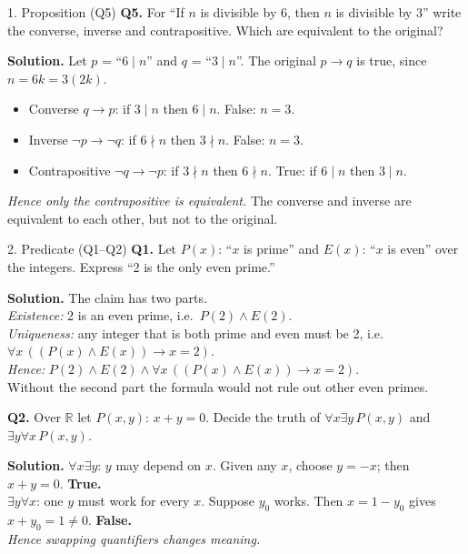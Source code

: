 \documentclass[aspectratio=169,10pt]{beamer}
\newcommand{\qa}[3]{%
  \textbf{Q#1.} #2\par\smallskip
  {\color{ans}\textbf{Solution.} #3}\par\vspace{6pt}}
\begin{document}
\begin{frame}{1. Proposition (Q5)}
\footnotesize
\qa{5}{For ``If $n$ is divisible by 6, then $n$ is divisible by 3'' write the converse, inverse and contrapositive. Which are equivalent to the original?}
{Let $p$ = ``$6\mid n$'' and $q$ = ``$3\mid n$''. The original $p\to q$ is true, since $n=6k=3(2k)$.
\begin{itemize}\footnotesize
 \item Converse $q\to p$: if $3\mid n$ then $6\mid n$. False: $n=3$.
 \item Inverse $\neg p\to\neg q$: if $6\nmid n$ then $3\nmid n$. False: $n=3$.
 \item Contrapositive $\neg q\to\neg p$: if $3\nmid n$ then $6\nmid n$. True: if $6\mid n$ then $3\mid n$.
\end{itemize}
\emph{Hence only the contrapositive is equivalent.} The converse and inverse are equivalent to each other, but not to the original.}
\end{frame}

\begin{frame}{2. Predicate (Q1--Q2)}
\footnotesize
\qa{1}{Let $P(x)$: ``$x$ is prime'' and $E(x)$: ``$x$ is even'' over the integers. Express ``2 is the only even prime.''}
{The claim has two parts.\\
\emph{Existence:} 2 is an even prime, i.e.\ $P(2)\land E(2)$.\\
\emph{Uniqueness:} any integer that is both prime and even must be 2, i.e.\ $\forall x\,((P(x)\land E(x))\to x=2)$.\\
\emph{Hence:} $P(2)\land E(2)\land\forall x\,((P(x)\land E(x))\to x=2)$.\\
Without the second part the formula would not rule out other even primes.}
\qa{2}{Over $\mathbb{R}$ let $P(x,y)$: $x+y=0$. Decide the truth of $\forall x\exists y\,P(x,y)$ and $\exists y\forall x\,P(x,y)$.}
{$\forall x\exists y$: $y$ may depend on $x$. Given any $x$, choose $y=-x$; then $x+y=0$. \textbf{True.}\\
$\exists y\forall x$: one $y$ must work for every $x$. Suppose $y_0$ works. Then $x=1-y_0$ gives $x+y_0=1\neq0$. \textbf{False.}\\
\emph{Hence swapping quantifiers changes meaning.}}
\end{frame}
\end{document}
